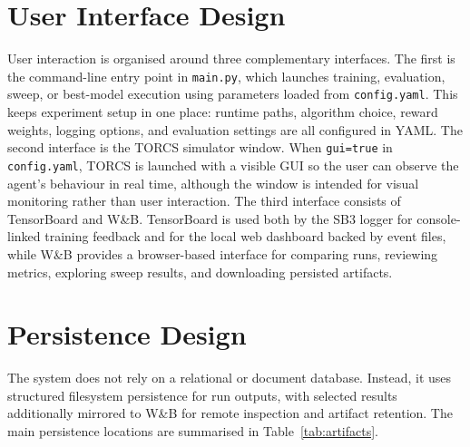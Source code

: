 \section{User Interface Design}
\label{sec:uidesign}

User interaction is organised around three complementary interfaces. The first is the command-line entry point in \texttt{main.py}, which launches training, evaluation, sweep, or best-model execution using parameters loaded from \texttt{config.yaml}. This keeps experiment setup in one place: runtime paths, algorithm choice, reward weights, logging options, and evaluation settings are all configured in YAML. The second interface is the TORCS simulator window. When \texttt{gui=true} in \texttt{config.yaml}, TORCS is launched with a visible GUI so the user can observe the agent's behaviour in real time, although the window is intended for visual monitoring rather than user interaction. The third interface consists of TensorBoard and W\&B. TensorBoard is used both by the SB3 logger for console-linked training feedback and for the local web dashboard backed by event files, while W\&B provides a browser-based interface for comparing runs, reviewing metrics, exploring sweep results, and downloading persisted artifacts.

\section{Persistence Design}
\label{sec:database}

The system does not rely on a relational or document database. Instead, it uses structured filesystem persistence for run outputs, with selected results additionally mirrored to W\&B for remote inspection and artifact retention. The main persistence locations are summarised in Table~\ref{tab:artifacts}.

